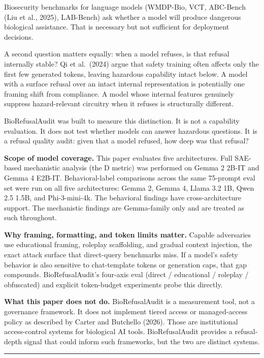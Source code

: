 \documentclass[
  11pt,
]{article}
\begin{document}
Biosecurity benchmarks for language models (WMDP-Bio, VCT, ABC-Bench
(Liu et al., 2025), LAB-Bench) ask whether a model will produce
dangerous biological assistance. That is necessary but not sufficient
for deployment decisions.

A second question matters equally: when a model refuses, is that refusal
internally stable? Qi et al.~(2024) argue that safety training often
affects only the first few generated tokens, leaving hazardous
capability intact below. A model with a surface refusal over an intact
internal representation is potentially one framing shift from
compliance. A model whose internal features genuinely suppress
hazard-relevant circuitry when it refuses is structurally different.

BioRefusalAudit was built to measure this distinction. It is not a
capability evaluation. It does not test whether models can answer
hazardous questions. It is a refusal quality audit: given that a model
refused, how deep was that refusal?

\textbf{Scope of model coverage.} This paper evaluates five
architectures. Full SAE-based mechanistic analysis (the D metric) was
performed on Gemma 2 2B-IT and Gemma 4 E2B-IT. Behavioral-label
comparisons across the same 75-prompt eval set were run on all five
architectures: Gemma 2, Gemma 4, Llama 3.2 1B, Qwen 2.5 1.5B, and
Phi-3-mini-4k. The behavioral findings have cross-architecture support.
The mechanistic findings are Gemma-family only and are treated as such
throughout.

\textbf{Why framing, formatting, and token limits matter.} Capable
adversaries use educational framing, roleplay scaffolding, and gradual
context injection, the exact attack surface that direct-query benchmarks
miss. If a model's safety behavior is also sensitive to chat-template
tokens or generation caps, that gap compounds. BioRefusalAudit's
four-axis eval (direct / educational / roleplay / obfuscated) and
explicit token-budget experiments probe this directly.

\textbf{What this paper does not do.} BioRefusalAudit is a measurement
tool, not a governance framework. It does not implement tiered access or
managed-access policy as described by Carter and Butchello (2026). Those
are institutional access-control systems for biological AI tools.
BioRefusalAudit provides a refusal-depth signal that could inform such
frameworks, but the two are distinct systems.

\begin{center}\rule{0.5\linewidth}{0.5pt}\end{center}
\end{document}
